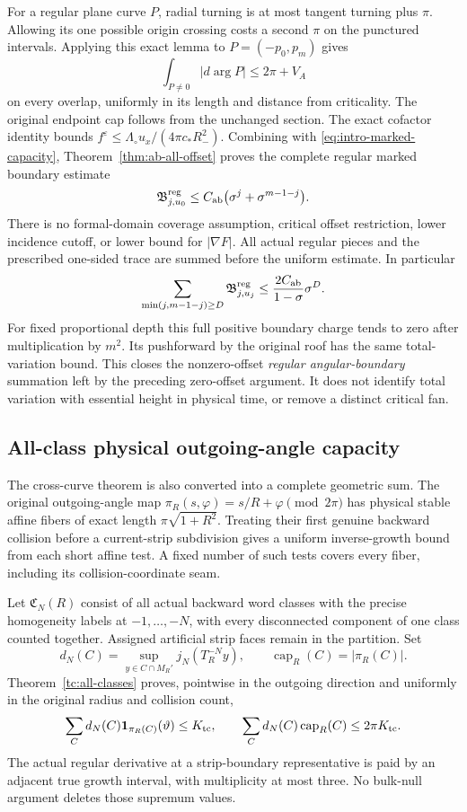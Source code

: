 For a regular plane curve $P$, radial turning is at most tangent
turning plus $\pi$. Allowing its one possible origin crossing costs
a second $\pi$ on the punctured intervals. Applying this exact
lemma to $P=(-p_0,p_m)$ gives
\[
 \int_{P\ne0}|d\arg P|\le 2\pi+V_A
\]
on every overlap, uniformly in its length and distance from criticality.
The original endpoint cap follows from the unchanged section.
The exact cofactor identity bounds
$f^\varepsilon\le\Lambda_\circ u_x/(4\pi c_*R_-^2)$.
Combining with \eqref{eq:intro-marked-capacity},
Theorem~\ref{thm:ab-all-offset} proves the complete regular marked
boundary estimate
\begin{equation}\label{eq:intro-all-offset}
 \mathfrak B^{\rm reg}_{j,u_0}
 \le C_{\rm ab}\bigl(\sigma^j+\sigma^{m-1-j}\bigr).
\end{equation}
There is no formal-domain coverage assumption, critical offset
restriction, lower incidence cutoff, or lower bound for $|\nabla F|$.
All actual regular pieces and the prescribed one-sided trace are summed
before the uniform estimate. In particular
\[
 \sum_{\min(j,m-1-j)\ge D}\mathfrak B^{\rm reg}_{j,u_j}
 \le\frac{2C_{\rm ab}}{1-\sigma}\sigma^D.
\]
For fixed proportional depth this full positive boundary charge tends
to zero after multiplication by $m^2$. Its pushforward by the original
roof has the same total-variation bound. This closes the nonzero-offset
\emph{regular angular-boundary} summation left by the preceding
zero-offset argument. It does not identify total variation with
essential height in physical time, or remove a distinct critical fan.

\subsection*{All-class physical outgoing-angle capacity}
The cross-curve theorem is also converted into a complete geometric
sum. The original outgoing-angle map
$\pi_R(s,\varphi)=s/R+\varphi\pmod{2\pi}$ has physical stable
affine fibers of exact length $\pi\sqrt{1+R^2}$. Treating their
first genuine backward collision before a current-strip subdivision
gives a uniform inverse-growth bound from each short affine test.
A fixed number of such tests covers every fiber, including its
collision-coordinate seam.

Let $\mathfrak C_N(R)$ consist of all actual backward word classes
with the precise homogeneity labels at $-1,\ldots,-N$, with every
disconnected component of one class counted together. Assigned
artificial strip faces remain in the partition. Set
\[
 d_N(C)=\sup_{y\in C\cap M_R'}j_N(T_R^{-N}y),
 \qquad \operatorname{cap}_R(C)=|\pi_R(C)|.
\]
Theorem~\ref{tc:all-classes} proves, pointwise in the outgoing
direction and uniformly in the original radius and collision count,
\[
 \sum_Cd_N(C)\mathbf1_{\pi_R(C)}(\vartheta)\le K_{\rm tc},
 \qquad \sum_Cd_N(C)\operatorname{cap}_R(C)\le2\pi K_{\rm tc}.
\]
The actual regular derivative at a strip-boundary representative is
paid by an adjacent true growth interval, with multiplicity at most
three. No bulk-null argument deletes those supremum values.

